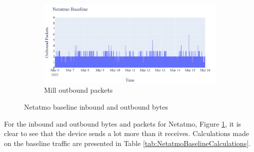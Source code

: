 \begin{figure}[H]
\begin{subfigure}[b]{0.4\textwidth}
    \end{subfigure}
    \begin{subfigure}[b]{0.4\textwidth}
        \includegraphics[width=\textwidth]{figures/Netatmo_Baseline_OutboundPackets.png}
        \caption{Mill outbound packets}
    \end{subfigure}
    \caption{Netatmo baseline inbound and outbound bytes}
    \label{Fig:NetatmoBaselineOutandInboundTraffic}
 \end{figure}

For the inbound and outbound bytes and packets for Netatmo, Figure \ref{Fig:NetatmoBaselineOutandInboundTraffic}, it is clear to see that the device sends a lot more than it receives. Calculations made on the baseline traffic are presented in Table \ref{tab:NetatmoBaselineCalculations}. 

